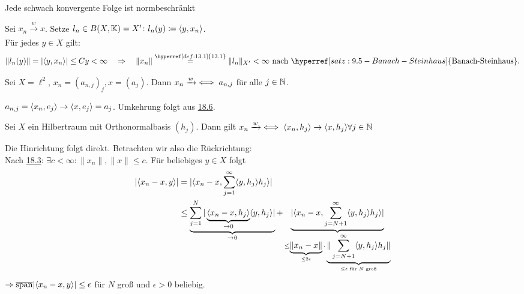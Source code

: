 \begin{prop}
	Jede schwach konvergente Folge ist normbeschränkt
\end{prop}

\begin{beweis}
	Sei $x_{n} \xrightarrow[]{w} x$. Setze $l_{n} \in B(X, \mathbb{K}) = X' \colon l_{n}(y) \coloneqq \langle y, x_{n} \rangle	$. \\
	Für jedes $y \in X$ gilt: 
	\[ \| l_{n}(y) \| = | \< y , x_{n} \> | \leq C y < \infty \quad \Rightarrow \quad \| x_{n} \| \overset{\hyperref[def:13.1]{13.1}}{=} \| l_{n} \|_{X'} < \infty \text{ nach } \hyperref[satz:9.5-Banach-Steinhaus]{\text{Banach-Steinhaus}}. \]
\end{beweis}


\begin{beispiel}
	Sei $X = \ell^{2}$, $x_{n} = (a_{n, j})_{j}, x = (a_{j})$. Dann $x_{n} \xrightarrow[]{w} \iff a_{n, j}$ für alle $j \in \mathbb{N}$.
\end{beispiel}

\begin{beweis}
	$a_{n, j} = \langle x_{n} , e_{j} \rangle \rightarrow \langle x , e_{j} \rangle = a_{j}$. Umkehrung folgt aus \hyperref[prop:18.6]{18.6}.	
\end{beweis}


\begin{prop} \label{prop:18.6}
	Sei $X$ ein Hilbertraum mit Orthonormalbasis $(h_{j})$. Dann gilt	$x_{n} \xrightarrow[]{w} \iff \langle x_{n} , h_{j} \rangle \rightarrow \langle x , h_{j} \rangle \forall j \in \mathbb{N}$
\end{prop}

\begin{beweis}
	Die Hinrichtung folgt direkt. Betrachten wir also die Rückrichtung: \\	
	Nach \hyperref[prop:18.3]{18.3}: $\exists c < \infty \colon \| x_{n} \|, \| x \| \leq c$. Für beliebiges $y \in X$ folgt
	\begin{align*}
		| \langle x_{n} - x , y \rangle | & = | \langle x_{n} - x , \sum_{j = 1}^{\infty} \langle y , h_{j} \rangle h_{j} \rangle | \\
			& \leq \underbrace{\sum_{j = 1}^{N} |\underbrace{\langle x_{n} - x , h_{j} \rangle}_{\rightarrow 0} \langle y  , h_{j} \rangle|}_{\rightarrow 0} + \underbrace{|\langle x_{n} - x ,\sum_{j = N + 1}^{\infty} \langle y , h_{j} \rangle h_{j} \rangle|}_{ \leq \underbrace{\| x_{n} - x \|}_{\leq 2 \epsilon} \cdot \underbrace{\| \sum_{j = N + 1}^{\infty} \langle y , h_{j} \rangle h_{j} \|}_{\leq \epsilon \text{ für } N \text{ gro{\ss}}}}
	\end{align*}
	$\Rightarrow \overline{\operatorname{span}} | \langle x_{n} - x , y \rangle | \leq \epsilon$ für $N$ gro{\ss} und $\epsilon > 0$ beliebig.
\end{beweis}


